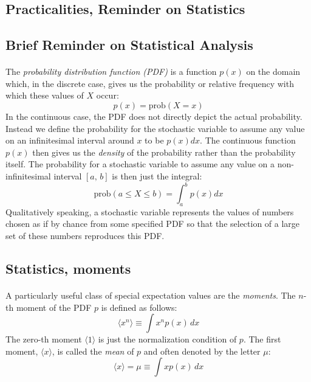 \documentclass[%
oneside,                 %
final,                   %
10pt]{article}
\begin{document}
\subsection{Practicalities, Reminder on Statistics}



\subsection{Brief Reminder on Statistical Analysis}

\paragraph{}
The \emph{probability distribution function (PDF)} is a function
$p(x)$ on the domain which, in the discrete case, gives us the
probability or relative frequency with which these values of $X$ occur:
\[
p(x) = \mathrm{prob}(X=x)
\]
In the continuous case, the PDF does not directly depict the
actual probability. Instead we define the probability for the
stochastic variable to assume any value on an infinitesimal interval
around $x$ to be $p(x)dx$. The continuous function $p(x)$ then gives us
the \emph{density} of the probability rather than the probability
itself. The probability for a stochastic variable to assume any value
on a non-infinitesimal interval $[a,\,b]$ is then just the integral:
\[
\mathrm{prob}(a\leq X\leq b) = \int_a^b p(x)dx
\]
Qualitatively speaking, a stochastic variable represents the values of
numbers chosen as if by chance from some specified PDF so that the
selection of a large set of these numbers reproduces this PDF.




\subsection{Statistics, moments}

\paragraph{}
A particularly useful class of special expectation values are the
\emph{moments}. The $n$-th moment of the PDF $p$ is defined as
follows:
\[
\langle x^n\rangle \equiv \int\! x^n p(x)\,dx
\]
The zero-th moment $\langle 1\rangle$ is just the normalization condition of
$p$. The first moment, $\langle x\rangle$, is called the \emph{mean} of $p$
and often denoted by the letter $\mu$:
\[
\langle x\rangle = \mu \equiv \int\! x p(x)\,dx
\]
\end{document}
